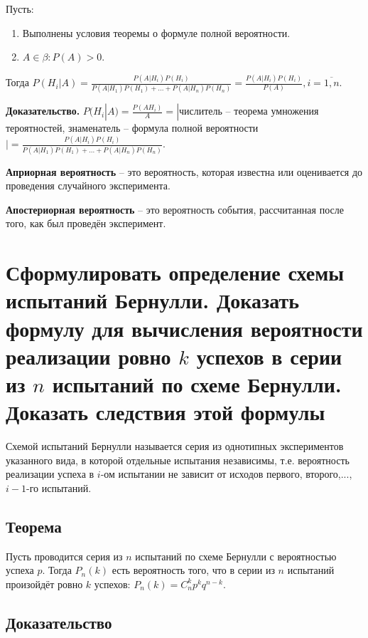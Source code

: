 Пусть: 
\begin{enumerate}
	\item Выполнены условия теоремы о формуле полной вероятности.
	\item $A \in \beta: P(A) > 0$.
\end{enumerate}
Тогда $P(H_i|A) = \frac{P(A|H_i)P(H_i)}{P(A|H_1)P(H_1)+...+P(A|H_n)P(H_n)} = \frac{P(A|H_i)P(H_i)}{P(A)}, i = \overline{1, n}$.

\textbf{Доказательство.} $P(H_i|A) = \frac{P(AH_i)}{A} = |$числитель -- теорема умножения тероятностей, знаменатель -- формула полной вероятности$|=\frac{P(A|H_i)P(H_i)}{P(A|H_1)P(H_1)+...+P(A|H_n)P(H_n)}$.

\textbf{Априорная вероятность} -- это вероятность, которая известна или оценивается до проведения случайного эксперимента.

\textbf{Апостериорная вероятность} -- это вероятность события, рассчитанная после того, как был проведён эксперимент. 

\section{Сформулировать определение схемы испытаний Бернулли. Доказать формулу для вычисления вероятности реализации ровно $k$ успехов в серии из $n$ испытаний по схеме Бернулли. Доказать следствия этой формулы}

Схемой испытаний Бернулли называется серия из однотипных экспериментов указанного вида, в которой отдельные испытания независимы, т.е. вероятность реализации успеха в $i$-ом испытании не зависит от исходов первого,
второго,...,$i-1$-го испытаний.

\subsection*{Теорема}

Пусть проводится серия из $n$ испытаний по схеме Бернулли с вероятностью успеха $p$. Тогда $P_n(k)$ есть вероятность того, что в серии из $n$ испытаний произойдёт ровно $k$ успехов: $P_n(k) = C_n^kp^kq^{n-k}$.

\subsection*{Доказательство}

